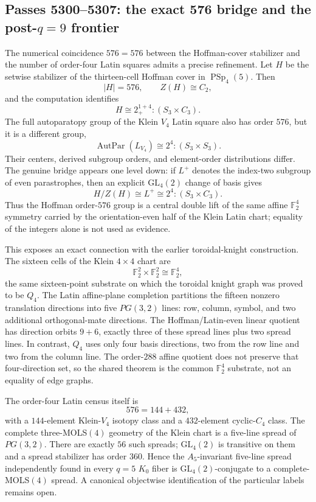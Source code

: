 \subsection{Passes 5300--5307: the exact 576 bridge and the post-$q=9$ frontier}

The numerical coincidence $576=576$ between the Hoffman-cover stabilizer and the
number of order-four Latin squares admits a precise refinement.  Let $H$ be the
setwise stabilizer of the thirteen-cell Hoffman cover in $\operatorname{PSp}_4(5)$.
Then
\[
 |H|=576,\qquad Z(H)\cong C_2,
\]
and the computation identifies
\[
 H\cong 2_{+}^{1+4}:(S_3\times C_3).
\]
The full autoparatopy group of the Klein $V_4$ Latin square also has order $576$,
but it is a different group,
\[
 \operatorname{AutPar}(L_{V_4})\cong 2^4:(S_3\times S_3).
\]
Their centers, derived subgroup orders, and element-order distributions differ.
The genuine bridge appears one level down: if $L^+$ denotes the index-two subgroup
of even parastrophes, then an explicit $\mathrm{GL}_4(2)$ change of basis gives
\[
 \boxed{H/Z(H)\cong L^+\cong 2^4:(S_3\times C_3).}
\]
Thus the Hoffman order-$576$ group is a central double lift of the same affine
$\mathbb F_2^4$ symmetry carried by the orientation-even half of the Klein Latin
chart; equality of the integers alone is not used as evidence.

This exposes an exact connection with the earlier toroidal-knight construction.
The sixteen cells of the Klein $4\times4$ chart are
\[
 \mathbb F_2^2\times\mathbb F_2^2\cong\mathbb F_2^4,
\]
the same sixteen-point substrate on which the toroidal knight graph was proved to
be $Q_4$.  The Latin affine-plane completion partitions the fifteen nonzero
translation directions into five $PG(3,2)$ lines: row, column, symbol, and two
additional orthogonal-mate directions.  The Hoffman/Latin-even linear quotient
has direction orbits $9+6$, exactly three of these spread lines plus two spread
lines.  In contrast, $Q_4$ uses only four basis directions, two from the row line
and two from the column line.  The order-$288$ affine quotient does not preserve
that four-direction set, so the shared theorem is the common $\mathbb F_2^4$
substrate, not an equality of edge graphs.

The order-four Latin census itself is
\[
 576=144+432,
\]
with a $144$-element Klein-$V_4$ isotopy class and a $432$-element cyclic-$C_4$
class.  The complete three-MOLS$(4)$ geometry of the Klein chart is a five-line
spread of $PG(3,2)$.  There are exactly $56$ such spreads; $\mathrm{GL}_4(2)$ is
transitive on them and a spread stabilizer has order $360$.  Hence the
$A_5$-invariant five-line spread independently found in every $q=5$ $K_0$ fiber is
$\mathrm{GL}_4(2)$-conjugate to a complete-MOLS$(4)$ spread.  A canonical
objectwise identification of the particular labels remains open.

